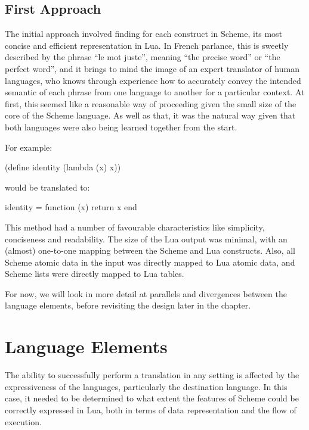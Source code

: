 \subsection{First Approach}

The initial approach involved finding for each construct in Scheme, its most
concise and efficient representation in Lua. In French parlance, this is sweetly
described by the phrase ``le mot juste'', meaning ``the precise word'' or ``the
perfect word'', and it brings to mind the image of an expert translator of
human languages, who knows through experience how to accurately convey the
intended semantic of each phrase from one language to another for a particular
context. At first, this seemed like a reasonable way of proceeding given the
small size of the core of the Scheme language. As well as that, it was the
natural way given that both languages were also being learned together from the
start.

\begin{framed}
For example:
\begin{center}\ttfamily (define identity (lambda (x) x))\end{center}

would be translated to:
\begin{center}\ttfamily identity = function (x) return x end\end{center}
\end{framed}

This method had a number of favourable characteristics like simplicity,
conciseness and readability. The size of the Lua output was minimal, with an
(almost) one-to-one mapping between the Scheme and Lua constructs. Also, all
Scheme atomic data in the input was directly mapped to Lua atomic data, and
Scheme lists were directly mapped to Lua tables.

For now, we will look in more detail at parallels and divergences between the
language elements, before revisiting the design later in the chapter.


\section{Language Elements}

The ability to successfully perform a translation in any setting is affected by
the expressiveness of the languages, particularly the destination language. In
this case, it needed to be determined to what extent the features of Scheme
could be correctly expressed in Lua, both in terms of data representation and
the flow of execution.

